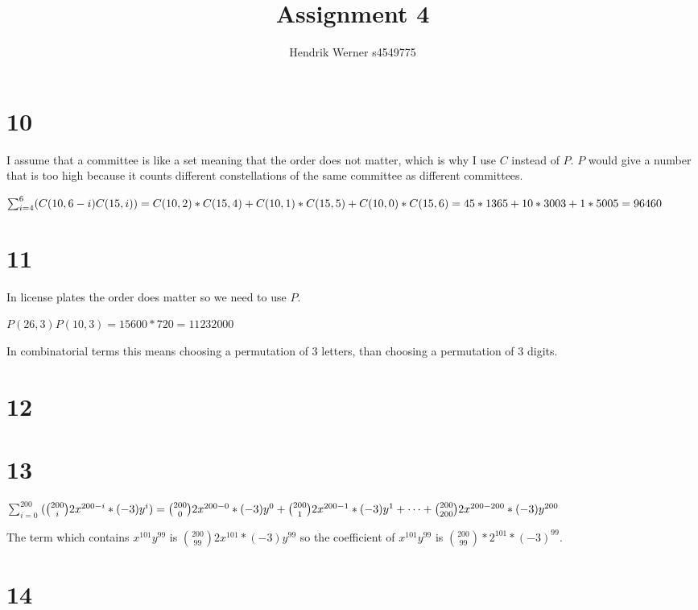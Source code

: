 \documentclass[12pt]{article}
\title {Assignment 4}
\author {Hendrik Werner s4549775}
\begin{document}
\maketitle

\section*{10}
I assume that a committee is like a set meaning that the order does not matter, which is why I use $C$ instead of $P$. $P$ would give a number that is too high because it counts different constellations of the same committee as different committees.

$\sum_{i = 4}^{6}(C(10, 6 - i)C(15, i))\\
= C(10, 2) * C(15, 4) + C(10, 1) * C(15, 5) + C(10, 0) * C(15, 6)\\
= 45 * 1365 + 10 * 3003 + 1 * 5005 = 96460$

\section*{11}
In license plates the order does matter so we need to use $P$.

$P(26, 3)P(10, 3) = 15 600 * 720 = 11 232 000$

In combinatorial terms this means choosing a permutation of 3 letters, than choosing a permutation of 3 digits.

\section*{12}
\section*{13}
$\sum_{i = 0}^{200}$$(\binom{200}{i} 2x^{200 - i} * (-3)y^i)\\
= \binom{200}{0} 2x^{200 - 0} * (-3)y^0 + \binom{200}{1} 2x^{200 - 1} * (-3)y^1 + \dots + \binom{200}{200} 2x^{200 - 200} * (-3)y^{200}$

The term which contains $x^{101}y^{99}$ is $\binom{200}{99} 2x^{101} * (-3)y^{99}$ so the coefficient of $x^{101}y^{99}$ is $\binom{200}{99} * 2^{101} * (-3)^{99}$.

\section*{14}
\end{document}
